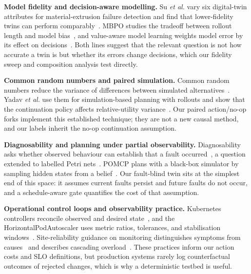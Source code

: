 \documentclass[conference]{IEEEtran}
\begin{document}
\textbf{Model fidelity and decision-aware modelling.} Su \emph{et al.} vary six digital-twin attributes for material-extrusion failure detection and find that lower-fidelity twins can perform comparably~\cite{fidelityam}. MBPO studies the tradeoff between rollout length and model bias~\cite{mbpo}, and value-aware model learning weights model error by its effect on decisions~\cite{vaml}. Both lines suggest that the relevant question is not how accurate a twin is but whether its errors change decisions, which our fidelity sweep and composition analysis test directly.

\textbf{Common random numbers and paired simulation.} Common random numbers reduce the variance of differences between simulated alternatives~\cite{crn}. Yadav \emph{et al.} use them for simulation-based planning with rollouts and show that the continuation policy affects relative-utility variance~\cite{yadav}. Our paired action/no-op forks implement this established technique; they are not a new causal method, and our labels inherit the no-op continuation assumption.

\textbf{Diagnosability and planning under partial observability.} Diagnosability asks whether observed behaviour can establish that a fault occurred~\cite{sampath}, a question extended to labelled Petri nets~\cite{cabasino}. POMCP plans with a black-box simulator by sampling hidden states from a belief~\cite{pomcp}. Our fault-blind twin sits at the simplest end of this space: it assumes current faults persist and future faults do not occur, and a schedule-aware gate quantifies the cost of that assumption.

\textbf{Operational control loops and observability practice.} Kubernetes controllers reconcile observed and desired state~\cite{k8scontroller}, and the HorizontalPodAutoscaler uses metric ratios, tolerances, and stabilisation windows~\cite{k8shpa}. Site-reliability guidance on monitoring distinguishes symptoms from causes~\cite{sre_monitoring} and describes cascading overload~\cite{sre_cascade}. These practices inform our action costs and SLO definitions, but production systems rarely log counterfactual outcomes of rejected changes, which is why a deterministic testbed is useful.
\end{document}
